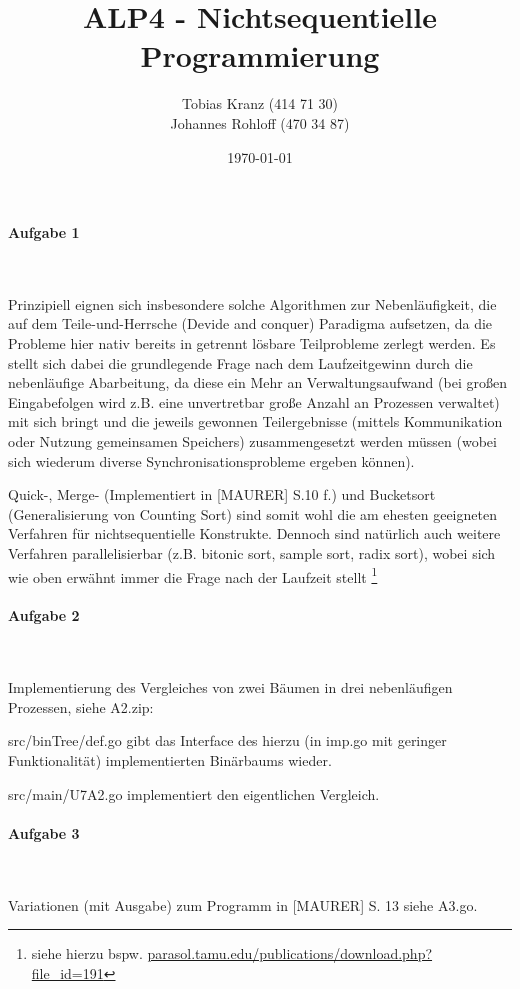 \documentclass[11pt]{scrartcl} %
\date{\today}
\author{Tobias Kranz (414 71 30)\\ Johannes Rohloff (470 34 87)}
\title{ALP4 - Nichtsequentielle Programmierung \UEBUNGSNR{}}
\begin{document}
\maketitle

\paragraph{Aufgabe 1}\

Prinzipiell eignen sich insbesondere solche Algorithmen zur Nebenläufigkeit, die auf dem Teile-und-Herrsche (Devide and conquer) Paradigma aufsetzen, da die Probleme hier nativ bereits in getrennt lösbare Teilprobleme zerlegt werden. 
Es stellt sich dabei die grundlegende Frage nach dem Laufzeitgewinn durch die nebenläufige Abarbeitung, da diese ein Mehr an Verwaltungsaufwand (bei großen Eingabefolgen wird z.B. eine unvertretbar große Anzahl an Prozessen verwaltet) mit sich bringt und die jeweils gewonnen Teilergebnisse (mittels Kommunikation oder Nutzung gemeinsamen Speichers) zusammengesetzt werden müssen (wobei sich wiederum diverse Synchronisationsprobleme ergeben können).

Quick-, Merge- (Implementiert in [MAURER] S.10 f.) und Bucketsort (Generalisierung von Counting Sort) sind somit wohl die am ehesten geeigneten Verfahren für nichtsequentielle Konstrukte. Dennoch sind natürlich auch weitere Verfahren parallelisierbar (z.B. bitonic sort, sample sort, radix sort), wobei sich wie oben erwähnt immer die Frage nach der Laufzeit stellt \footnote{siehe hierzu bspw. \url{parasol.tamu.edu/publications/download.php?file_id=191}}

\paragraph{Aufgabe 2}\

Implementierung des Vergleiches von zwei Bäumen in drei nebenläufigen Prozessen, siehe A2.zip:

src/binTree/def.go gibt das Interface des hierzu (in imp.go mit geringer Funktionalität) implementierten Binärbaums wieder.

src/main/U7A2.go implementiert den eigentlichen Vergleich. 

\paragraph{Aufgabe 3}\

Variationen (mit Ausgabe) zum Programm in [MAURER] S. 13 siehe A3.go. 
\end{document}
